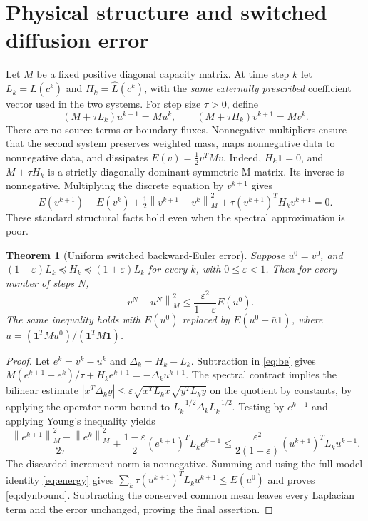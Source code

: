 \documentclass[11pt]{article}
\newtheorem{theorem}{Theorem}
\newcommand{\one}{\mathbf 1}
\newcommand{\eps}{\varepsilon}
\newcommand{\Lo}{\widehat L}
\newcommand{\norm}[1]{\left\lVert#1\right\rVert}
\begin{document}
\section{Physical structure and switched diffusion error}
Let $M$ be a fixed positive diagonal capacity matrix. At time step $k$ let $L_k=L(c^k)$ and $H_k=\Lo(c^k)$, with the \emph{same externally prescribed} coefficient vector used in the two systems. For step size $\tau>0$, define
\begin{equation}\label{eq:be}
(M+\tau L_k)u^{k+1}=Mu^k,\qquad
(M+\tau H_k)v^{k+1}=Mv^k.
\end{equation}
There are no source terms or boundary fluxes. Nonnegative multipliers ensure that the second system preserves weighted mass, maps nonnegative data to nonnegative data, and dissipates $E(v)=\tfrac12v^TMv$. Indeed, $H_k\one=0$, and $M+\tau H_k$ is a strictly diagonally dominant symmetric M-matrix. Its inverse is nonnegative. Multiplying the discrete equation by $v^{k+1}$ gives
\begin{equation}\label{eq:energy}
E(v^{k+1})-E(v^k)+\tfrac12\norm{v^{k+1}-v^k}_M^2
+\tau(v^{k+1})^TH_kv^{k+1}=0.
\end{equation}
These standard structural facts hold even when the spectral approximation is poor.

\begin{theorem}[Uniform switched backward-Euler error]\label{thm:dyn}
Suppose $u^0=v^0$, and $(1-\eps)L_k\preceq H_k\preceq(1+\eps)L_k$ for every $k$, with $0\le\eps<1$. Then for every number of steps $N$,
\begin{equation}\label{eq:dynbound}
\norm{v^N-u^N}_M^2\le \frac{\eps^2}{1-\eps}E(u^0).
\end{equation}
The same inequality holds with $E(u^0)$ replaced by $E(u^0-\bar u\one)$, where $\bar u=(\one^TMu^0)/(\one^TM\one)$.
\end{theorem}
\begin{proof}
Let $e^k=v^k-u^k$ and $\Delta_k=H_k-L_k$. Subtraction in \eqref{eq:be} gives
$M(e^{k+1}-e^k)/\tau+H_ke^{k+1}=-\Delta_ku^{k+1}$.
The spectral contract implies the bilinear estimate
$|x^T\Delta_ky|\le\eps\sqrt{x^TL_kx}\sqrt{y^TL_ky}$ on the quotient by constants, by applying the operator norm bound to $L_k^{-1/2}\Delta_kL_k^{-1/2}$. Testing by $e^{k+1}$ and applying Young's inequality yields
\[
\frac{\norm{e^{k+1}}_M^2-\norm{e^k}_M^2}{2\tau}
+\frac{1-\eps}{2}(e^{k+1})^TL_ke^{k+1}
\le\frac{\eps^2}{2(1-\eps)}(u^{k+1})^TL_ku^{k+1}.
\]
The discarded increment norm is nonnegative. Summing and using the full-model identity \eqref{eq:energy} gives
$\sum_k\tau(u^{k+1})^TL_ku^{k+1}\le E(u^0)$ and proves \eqref{eq:dynbound}. Subtracting the conserved common mean leaves every Laplacian term and the error unchanged, proving the final assertion.
\end{proof}
\end{document}
